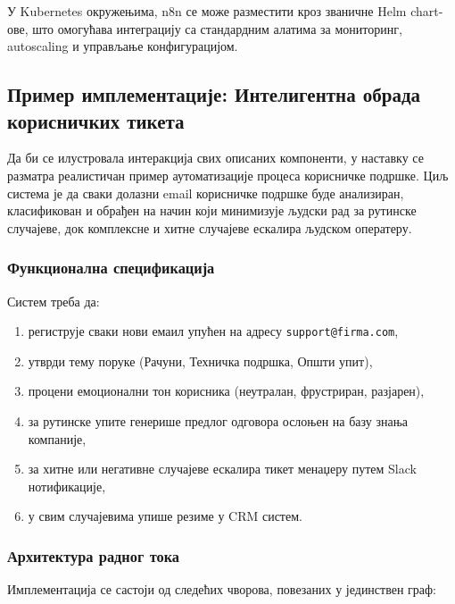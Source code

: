 У Kubernetes окружењима, n8n се може разместити кроз званичне
Helm chart-ове, што омогућава интеграцију са стандардним алатима
за мониторинг, autoscaling и управљање конфигурацијом.

\subsection{Пример имплементације: Интелигентна обрада корисничких тикета}

Да би се илустровала интеракција свих описаних компоненти, у наставку
се разматра реалистичан пример аутоматизације процеса корисничке
подршке. Циљ система је да сваки долазни email корисничке подршке
буде анализиран, класификован и обрађен на начин који минимизује
људски рад за рутинске случајеве, док комплексне и хитне случајеве
ескалира људском оператеру.

\subsubsection{Функционална спецификација}

Систем треба да:
\begin{enumerate}
    \item региструје сваки нови емаил упућен на адресу
    \texttt{support@firma.com},
    \item утврди тему поруке (Рачуни, Техничка подршка, Општи упит),
    \item процени емоционални тон корисника (неутралан, фрустриран,
    разјарен),
    \item за рутинске упите генерише предлог одговора ослоњен на
    базу знања компаније,
    \item за хитне или негативне случајеве ескалира тикет менаџеру
    путем Slack нотификације,
    \item у свим случајевима упише резиме у CRM систем.
\end{enumerate}

\subsubsection{Архитектура радног тока}

Имплементација се састоји од следећих чворова, повезаних у јединствен
граф:

